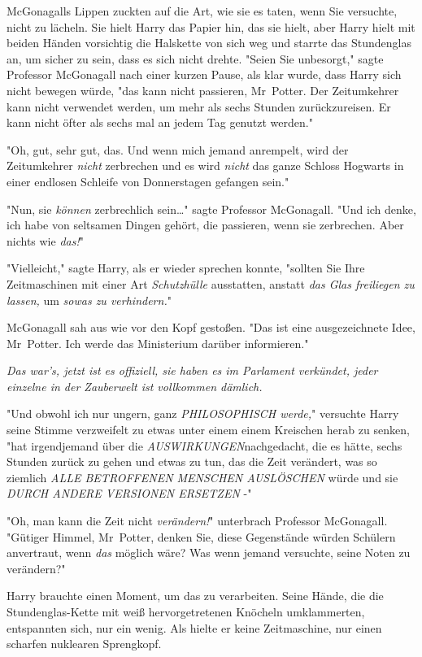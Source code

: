{McGonagalls Lippen zuckten auf die Art, wie sie es taten, wenn Sie versuchte, nicht zu lächeln. Sie hielt Harry das Papier hin, das sie hielt, aber Harry hielt mit beiden Händen vorsichtig die Halskette von sich weg und starrte das Stundenglas an, um sicher zu sein, dass es sich nicht drehte. "Seien Sie unbesorgt," sagte Professor McGonagall nach einer kurzen Pause, als klar wurde, dass Harry sich nicht bewegen würde, "das kann nicht passieren, Mr~Potter. Der Zeitumkehrer kann nicht verwendet werden, um mehr als sechs Stunden zurückzureisen. Er kann nicht öfter als sechs mal an jedem Tag genutzt werden."

"Oh, gut, sehr gut, das. Und wenn mich jemand anrempelt, wird der Zeitumkehrer \emph{nicht} zerbrechen und es wird \emph{nicht} das ganze Schloss Hogwarts in einer endlosen Schleife von Donnerstagen gefangen sein."

"Nun, sie \emph{können} zerbrechlich sein…" sagte Professor McGonagall. "Und ich denke, ich habe von seltsamen Dingen gehört, die passieren, wenn sie zerbrechen. Aber nichts wie \emph{das!}"

"Vielleicht," sagte Harry, als er wieder sprechen konnte, "sollten Sie Ihre Zeitmaschinen mit einer Art \emph{Schutzhülle} ausstatten, anstatt \emph{das Glas freiliegen zu lassen,} um \emph{sowas zu verhindern.}"

McGonagall sah aus wie vor den Kopf gestoßen. "Das ist eine ausgezeichnete Idee, Mr~Potter. Ich werde das Ministerium darüber informieren."

\emph{Das war's, jetzt ist es offiziell, sie haben es im Parlament verkündet, jeder einzelne in der Zauberwelt ist vollkommen dämlich.}

"Und obwohl ich nur ungern, ganz \emph{PHILOSOPHISCH werde,}" versuchte Harry seine Stimme verzweifelt zu etwas unter einem einem Kreischen herab zu senken, "hat irgendjemand über die \emph{AUSWIRKUNGEN}nachgedacht, die es hätte, sechs Stunden zurück zu gehen und etwas zu tun, das die Zeit verändert, was so ziemlich \emph{ALLE BETROFFENEN MENSCHEN AUSLÖSCHEN} würde und sie \emph{DURCH ANDERE VERSIONEN ERSETZEN} -"

"Oh, man kann die Zeit nicht \emph{verändern!}" unterbrach Professor McGonagall. "Gütiger Himmel, Mr~Potter, denken Sie, diese Gegenstände würden Schülern anvertraut, wenn \emph{das} möglich wäre? Was wenn jemand versuchte, seine Noten zu verändern?"

Harry brauchte einen Moment, um das zu verarbeiten. Seine Hände, die die Stundenglas-Kette mit weiß hervorgetretenen Knöcheln umklammerten, entspannten sich, nur ein wenig. Als hielte er keine Zeitmaschine, nur einen scharfen nuklearen Sprengkopf.

}
